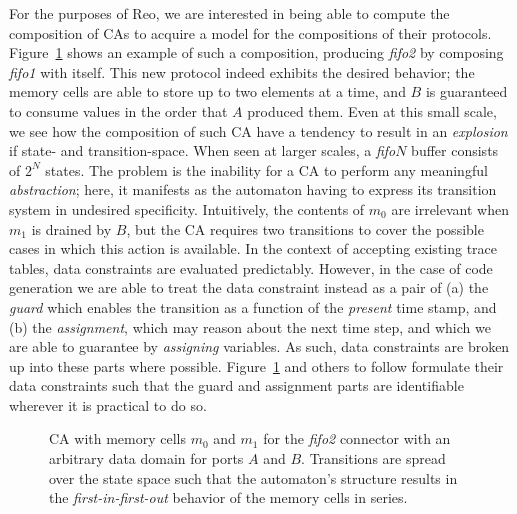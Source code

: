 For the purposes of Reo, we are interested in being able to compute the composition of CAs to acquire a model for the compositions of their protocols. Figure~\ref{fig:fifo2_ca} shows an example of such a composition, producing \textit{fifo2} by composing \textit{fifo1} with itself. This new protocol indeed exhibits the desired behavior; the memory cells are able to store up to two elements at a time, and $B$ is guaranteed to consume values in the order that $A$ produced them. Even at this small scale, we see how the composition of such CA have a tendency to result in an \textit{explosion} if state- and transition-space. When seen at larger scales, a \textit{fifo$N$} buffer consists of $2^N$ states. The problem is the inability for a CA to perform any meaningful \textit{abstraction}; here, it manifests as the automaton having to express its transition system in undesired specificity. Intuitively, the contents of $m_0$ are irrelevant when $m_1$ is drained by $B$, but the CA requires two transitions to cover the possible cases in which this action is available. In the context of accepting existing trace tables, data constraints are evaluated predictably. However, in the case of code generation we are able to treat the data constraint instead as a pair of (a) the \textit{guard} which enables the transition as a function of the \textit{present} time stamp, and (b) the \textit{assignment}, which may reason about the next time step, and which we are able to guarantee by \textit{assigning} variables. As such, data constraints are broken up into these parts where possible. Figure~\ref{fig:fifo2_ca} and others to follow formulate their data constraints such that the guard and assignment parts are identifiable wherever it is practical to do so.


\begin{figure}[ht]
	\centering
	\caption[CA with memory for fifo2 connector.]{CA with memory cells $m_0$ and $m_1$ for the \textit{fifo2} connector with an arbitrary data domain for ports $A$ and $B$. Transitions are spread over the state space such that the automaton's structure results in the \textit{first-in-first-out} behavior of the memory cells in series.}
	\label{fig:fifo2_ca}
\end{figure}


